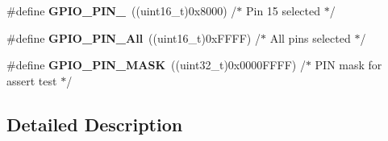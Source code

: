 \begin{DoxyCompactItemize}
\item 
\hypertarget{group___g_p_i_o__pins_ga77be5756e80bcdf18e1aa39b35d1d640}{\#define {\bfseries G\-P\-I\-O\-\_\-\-P\-I\-N\-\_}~((uint16\-\_\-t)0x8000)  /$\ast$ Pin 15 selected   $\ast$/}\label{group___g_p_i_o__pins_ga77be5756e80bcdf18e1aa39b35d1d640}

\item 
\hypertarget{group___g_p_i_o__pins_gac04170878de13aa9785f6bd666c9faa5}{\#define {\bfseries G\-P\-I\-O\-\_\-\-P\-I\-N\-\_\-\-All}~((uint16\-\_\-t)0x\-F\-F\-F\-F)  /$\ast$ All pins selected $\ast$/}\label{group___g_p_i_o__pins_gac04170878de13aa9785f6bd666c9faa5}

\item 
\hypertarget{group___g_p_i_o__pins_gab135afee57cdef0f647ab153f88b6d2f}{\#define {\bfseries G\-P\-I\-O\-\_\-\-P\-I\-N\-\_\-\-M\-A\-S\-K}~((uint32\-\_\-t)0x0000\-F\-F\-F\-F) /$\ast$ P\-I\-N mask for assert test $\ast$/}\label{group___g_p_i_o__pins_gab135afee57cdef0f647ab153f88b6d2f}

\end{DoxyCompactItemize}


\subsection{Detailed Description}
